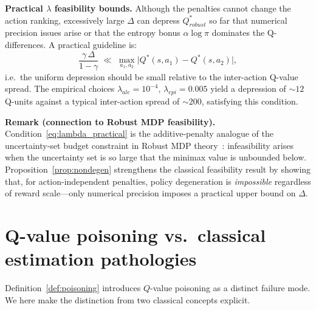 \medskip
\noindent\textbf{Practical $\lambda$ feasibility bounds.}
Although the penalties cannot change the action ranking, excessively large
$\Delta$ can depress $Q^*_{robust}$ so far that numerical precision issues
arise or that the entropy bonus $\alpha\log\pi$ dominates the Q-differences.
A practical guideline is:
\begin{equation}
    \frac{\gamma\,\Delta}{1-\gamma} \;\ll\; \max_{a_1,a_2}\bigl|Q^*(s,a_1)-Q^*(s,a_2)\bigr|,
    \label{eq:lambda_practical}
\end{equation}
i.e.\ the uniform depression should be small relative to the inter-action
Q-value spread.  The empirical choices $\lambda_{ale}=10^{-4}$,
$\lambda_{epi}=0.005$ yield a depression of $\sim\!12$ Q-units against a
typical inter-action spread of $\sim\!200$, satisfying this condition.

\medskip
\noindent\textbf{Remark (connection to Robust MDP feasibility).}
Condition~\eqref{eq:lambda_practical} is the additive-penalty analogue of the
uncertainty-set budget constraint in Robust MDP theory~\cite{Iyengar2005RobustDP}:
infeasibility arises when the uncertainty set is so large that the minimax
value is unbounded below.  Proposition~\ref{prop:nondegen} strengthens the
classical feasibility result by showing that, for action-independent penalties,
policy degeneration is \emph{impossible} regardless of reward scale---only
numerical precision imposes a practical upper bound on $\Delta$.



\section{Q-value poisoning vs.\ classical estimation pathologies}
\label{app:poisoning_vs_classical}

Definition~\ref{def:poisoning} introduces $Q$-value poisoning as a distinct
failure mode.  We here make the distinction from two classical concepts
explicit.

